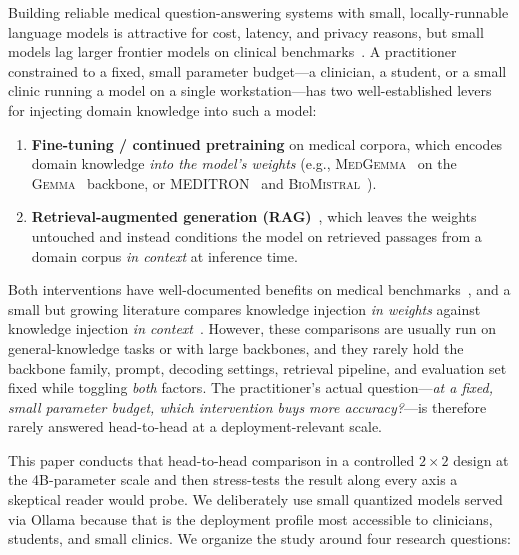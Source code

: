 \documentclass[11pt,a4paper]{article}
\begin{document}
Building reliable medical question-answering systems with small,
locally-runnable language models is attractive for cost, latency, and
privacy reasons, but small models lag larger frontier models on
clinical benchmarks~\cite{singhal2023medpalm,nori2023gpt4medical}. A practitioner
constrained to a fixed, small parameter budget---a clinician, a student, or a
small clinic running a model on a single workstation---has two well-established
levers for injecting domain knowledge into such a model:
\begin{enumerate}
  \item \textbf{Fine-tuning / continued pretraining} on medical
    corpora, which encodes domain knowledge \emph{into the model's weights}
    (e.g., \textsc{MedGemma}~\cite{sellergren2025medgemma} on the
    \textsc{Gemma}~\cite{team2024gemma} backbone, or
    \textsc{MEDITRON}~\cite{chen2023meditron} and
    \textsc{BioMistral}~\cite{labrak2024biomistral}).
  \item \textbf{Retrieval-augmented generation
    (RAG)}~\cite{lewis2020rag,gao2023ragsurvey}, which leaves the weights
    untouched and instead conditions the model on retrieved passages from a
    domain corpus \emph{in context} at inference time.
\end{enumerate}

Both interventions have well-documented benefits on medical
benchmarks~\cite{xiong2024benchmarkingrag,wang2024augmentingblackbox}, and a
small but growing literature compares knowledge injection \emph{in weights}
against knowledge injection \emph{in
context}~\cite{ovadia2024finetuningvsrag,soudani2024finetuningvsrag,gekhman2024hallucinations}.
However, these comparisons are usually run on general-knowledge tasks or with
large backbones, and they rarely hold the backbone family, prompt, decoding
settings, retrieval pipeline, and evaluation set fixed while toggling
\emph{both} factors. The practitioner's actual question---\emph{at a fixed,
small parameter budget, which intervention buys more accuracy?}---is therefore
rarely answered head-to-head at a deployment-relevant scale.

This paper conducts that head-to-head comparison in a controlled
$2\!\times\!2$ design at the 4B-parameter scale and then stress-tests the result
along every axis a skeptical reader would probe. We deliberately use small
quantized models served via Ollama because that is the deployment profile most
accessible to clinicians, students, and small clinics. We organize the study
around four research questions:
\end{document}
